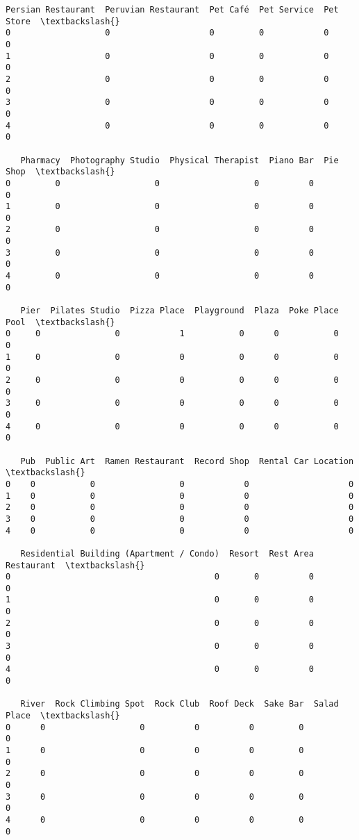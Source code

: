 \documentclass[11pt]{article}
\begin{document}
\begin{tcolorbox}[breakable, size=fbox, boxrule=.5pt, pad at break*=1mm, opacityfill=0]
\begin{Verbatim}[commandchars=\\\{\}]
   Persian Restaurant  Peruvian Restaurant  Pet Café  Pet Service  Pet Store  \textbackslash{}
0                   0                    0         0            0          0
1                   0                    0         0            0          0
2                   0                    0         0            0          0
3                   0                    0         0            0          0
4                   0                    0         0            0          0

   Pharmacy  Photography Studio  Physical Therapist  Piano Bar  Pie Shop  \textbackslash{}
0         0                   0                   0          0         0
1         0                   0                   0          0         0
2         0                   0                   0          0         0
3         0                   0                   0          0         0
4         0                   0                   0          0         0

   Pier  Pilates Studio  Pizza Place  Playground  Plaza  Poke Place  Pool  \textbackslash{}
0     0               0            1           0      0           0     0
1     0               0            0           0      0           0     0
2     0               0            0           0      0           0     0
3     0               0            0           0      0           0     0
4     0               0            0           0      0           0     0

   Pub  Public Art  Ramen Restaurant  Record Shop  Rental Car Location  \textbackslash{}
0    0           0                 0            0                    0
1    0           0                 0            0                    0
2    0           0                 0            0                    0
3    0           0                 0            0                    0
4    0           0                 0            0                    0

   Residential Building (Apartment / Condo)  Resort  Rest Area  Restaurant  \textbackslash{}
0                                         0       0          0           0
1                                         0       0          0           0
2                                         0       0          0           0
3                                         0       0          0           0
4                                         0       0          0           0

   River  Rock Climbing Spot  Rock Club  Roof Deck  Sake Bar  Salad Place  \textbackslash{}
0      0                   0          0          0         0            0
1      0                   0          0          0         0            0
2      0                   0          0          0         0            0
3      0                   0          0          0         0            0
4      0                   0          0          0         0            0


\end{Verbatim}
\end{tcolorbox}
\end{document}

